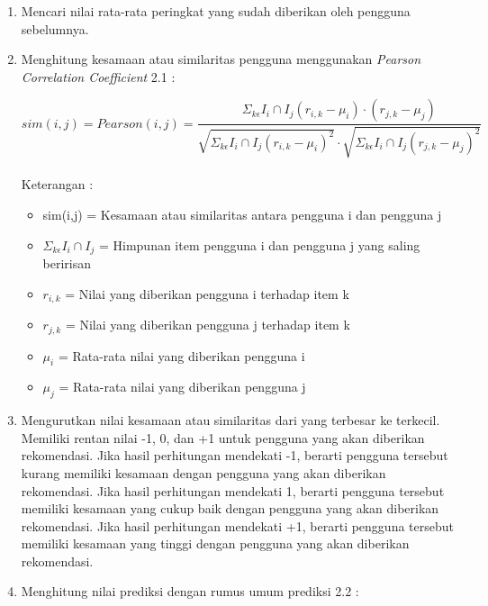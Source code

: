 \begin{enumerate}
	\item Mencari nilai rata-rata peringkat yang sudah diberikan oleh pengguna sebelumnya.
	
	\item Menghitung kesamaan atau similaritas pengguna menggunakan \textit{Pearson Correlation Coefficient} 2.1 :
	
	\begin{equation}
		sim(i,j) = Pearson(i,j) = \frac{\Sigma _{k\epsilon} I_{i} \cap I_{j} (r_{i,k}-\mu_{i}) \cdot (r_{j,k}-\mu_{j})}{\sqrt{\Sigma _{k\epsilon} I_{i} \cap I_{j} (r_{i,k}-\mu_{i})^2} \cdot \sqrt{\Sigma _{k\epsilon} I_{i} \cap I_{j} (r_{j,k}-\mu_{j})^2 }}
	\end{equation}\leavevmode \\
	Keterangan : 
	\begin{itemize}
		\item sim(i,j) = Kesamaan atau similaritas antara pengguna i dan pengguna j
		
		\item $\Sigma _{k\epsilon} I_{i} \cap I_{j}$ = Himpunan item pengguna i dan pengguna j yang saling beririsan
		
		\item $r_{i,k}$ = Nilai yang diberikan pengguna i terhadap item k
		
		\item $r_{j,k}$ = Nilai yang diberikan pengguna j terhadap item k
		
		\item $\mu_{i}$ = Rata-rata nilai yang diberikan pengguna i
		
		\item $\mu_{j}$ = Rata-rata nilai yang diberikan pengguna j
	\end{itemize}\leavevmode
	
	\item Mengurutkan nilai kesamaan atau similaritas dari yang terbesar ke terkecil. Memiliki rentan nilai -1, 0, dan +1 untuk pengguna yang akan diberikan rekomendasi. Jika hasil perhitungan mendekati -1, berarti pengguna tersebut kurang memiliki kesamaan dengan pengguna yang akan diberikan rekomendasi. Jika hasil perhitungan mendekati 1, berarti pengguna tersebut memiliki kesamaan yang cukup baik dengan pengguna yang akan diberikan rekomendasi. Jika hasil perhitungan mendekati +1, berarti pengguna tersebut memiliki kesamaan yang tinggi dengan pengguna yang akan diberikan rekomendasi.
	\item Menghitung nilai prediksi dengan rumus umum prediksi 2.2 :
	

\end{enumerate}
